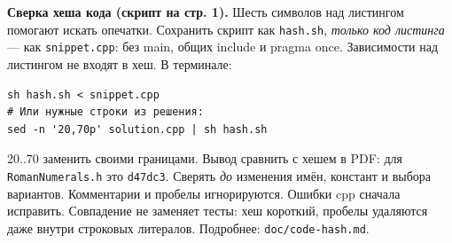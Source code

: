 \textbf{Сверка хеша кода (скрипт на стр. 1).}
Шесть символов над листингом помогают искать опечатки.
Сохранить скрипт как \texttt{hash.sh}, \emph{только код листинга} —
как \texttt{snippet.cpp}: без main, общих include и pragma once.
Зависимости над листингом не входят в хеш. В терминале:
\begin{lstlisting}[language={}]
sh hash.sh < snippet.cpp
# Или нужные строки из решения:
sed -n '20,70p' solution.cpp | sh hash.sh
\end{lstlisting}
20..70 заменить своими границами. Вывод сравнить с хешем в PDF:
для \texttt{RomanNumerals.h} это \texttt{d47dc3}.
Сверять \emph{до} изменения имён, констант и выбора вариантов.
Комментарии и пробелы игнорируются. Ошибки cpp сначала исправить.
Совпадение не заменяет тесты: хеш короткий, пробелы удаляются даже
внутри строковых литералов. Подробнее: \texttt{doc/code-hash.md}.
